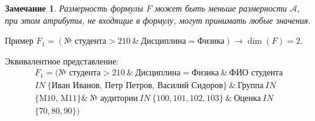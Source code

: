 \documentclass[xcolor=dvipsnames]{beamer}
\newtheorem*{mynote}{Замечание}
\begin{document}
\begin{frame}
\frametitle{\insertsection}
\begin{mynote}
Размерность формулы $F$ может быть меньше
размерности $\mathcal{A}$, при этом атрибуты, не входящие в формулу, могут
принимать любые значения.
\end{mynote}

\begin{block}{Пример}
$F_1 = (\text{№ студента} > 210\ \&\ \text{Дисциплина} = \text{Физика}) \rightarrow \dim(F) = 2$.

\vspace{\baselineskip}

Эквивалентное представление:
\begin{multline*}
F_1 = (\text{№ студента} > 210\ \&\ \text{Дисциплина} = \text{Физика}\ \&\ \text{ФИО студента}\\
\textit{IN}\
\{\text{Иван Иванов, Петр Петров, Василий Сидоров}\}\ \&\ \text{Группа}\ \textit{IN}\\
\{\text{M10, M11}\} \&\ \text{№ аудитории}\ \textit{IN}\ \{100, 101, 102, 103\}\ \&\ \text{Оценка}\ \textit{IN}\\
\{70, 80, 90\})
\end{multline*}
\end{block}
\end{frame}
\end{document}
